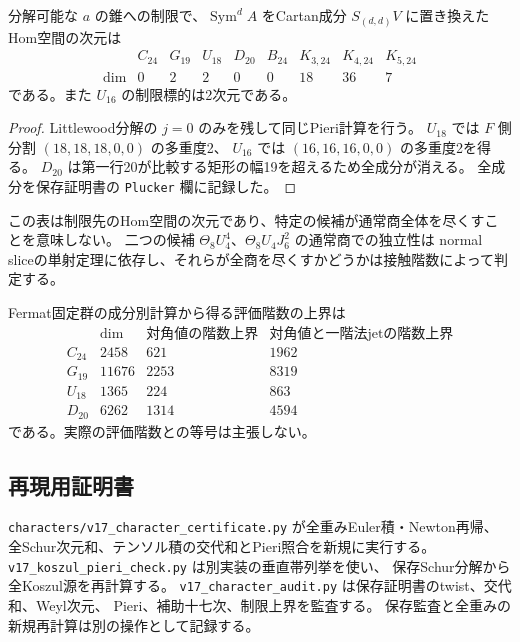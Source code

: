 \begin{proposition}[Pl\"ucker錐への制限の標的次元]
\label{prop:v17-plucker-dimensions}
分解可能な $a$ の錐への制限で、$\operatorname{Sym}^dA$ をCartan成分
$S_{(d,d)}V$ に置き換えたHom空間の次元は
\[
\begin{array}{c|rrrrrrrr}
 &C_{24}&G_{19}&U_{18}&D_{20}&B_{24}&K_{3,24}&K_{4,24}&K_{5,24}\\\hline
 \dim&0&2&2&0&0&18&36&7
\end{array}
\]
である。また $U_{16}$ の制限標的は2次元である。
\end{proposition}

\begin{proof}
Littlewood分解の $j=0$ のみを残して同じPieri計算を行う。
$U_{18}$ では $F$ 側分割 $(18,18,18,0,0)$ の多重度2、
$U_{16}$ では $(16,16,16,0,0)$ の多重度2を得る。
$D_{20}$ は第一行20が比較する矩形の幅19を超えるため全成分が消える。
全成分を保存証明書の \texttt{Plucker} 欄に記録した。
\end{proof}

この表は制限先のHom空間の次元であり、特定の候補が通常商全体を尽くすことを意味しない。
二つの候補 $\Theta_8U_4^4$、$\Theta_8U_4J_6^2$ の通常商での独立性は
normal sliceの単射定理に依存し、それらが全商を尽くすかどうかは接触階数によって判定する。

Fermat固定群の成分別計算から得る評価階数の上界は
\[
\begin{array}{c|r|r|r}
 &\dim&\text{対角値の階数上界}&\text{対角値と一階法jetの階数上界}\\\hline
C_{24}&2458&621&1962\\
G_{19}&11676&2253&8319\\
U_{18}&1365&224&863\\
D_{20}&6262&1314&4594
\end{array}
\]
である。実際の評価階数との等号は主張しない。

\subsection{再現用証明書}

\texttt{characters/v17\_character\_certificate.py} が全重みEuler積・Newton再帰、
全Schur次元和、テンソル積の交代和とPieri照合を新規に実行する。
\texttt{v17\_koszul\_pieri\_check.py} は別実装の垂直帯列挙を使い、
保存Schur分解から全Koszul源を再計算する。
\texttt{v17\_character\_audit.py} は保存証明書のtwist、交代和、Weyl次元、
Pieri、補助十七次、制限上界を監査する。
保存監査と全重みの新規再計算は別の操作として記録する。


